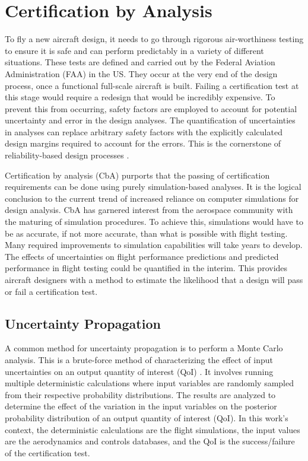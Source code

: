 \section{Certification by Analysis} \label{intro_cba}

To fly a new aircraft design, it needs to go through rigorous air-worthiness testing to ensure it is safe and can perform predictably in a variety of different situations.
These tests are defined and carried out by the Federal Aviation Administration (FAA) \cite{romanowski_flight_2018} in the US.
They occur at the very end of the design process, once a functional full-scale aircraft is built. 
Failing a certification test at this stage would require a redesign that would be incredibly expensive. 
To prevent this from occurring, safety factors are employed to account for potential uncertainty and error in the design analyses.
The quantification of uncertainties in analyses can replace arbitrary safety factors with the explicitly calculated design margins required to account for the errors.
This is the cornerstone of reliability-based design processes \cite{reliability}.

Certification by analysis (CbA) purports that the passing of certification requirements can be done using purely simulation-based analyses. 
It is the logical conclusion to the current trend of increased reliance on computer simulations for design analysis.
CbA has garnered interest from the aerospace community with the maturing of simulation procedures.
To achieve this, simulations would have to be as accurate, if not more accurate, than what is possible with flight testing.  
Many required improvements to simulation capabilities \cite{slotnick_cfd_nodate} will take years to develop.
The effects of uncertainties on flight performance predictions and predicted performance in flight testing could be quantified in the interim.
This provides aircraft designers with a method to estimate the likelihood that a design will pass or fail a certification test.

\subsection{Uncertainty Propagation}

A common method for uncertainty propagation is to perform a Monte Carlo analysis.
This is a brute-force method of characterizing the effect of input uncertainties on an output quantity of interest (QoI) \cite{janssen2013monte,thompson1992monte}.
It involves running multiple deterministic calculations where input variables are randomly sampled from their respective probability distributions.
The results are analyzed to determine the effect of the variation in the input variables on the posterior probability distribution of an output quantity of interest (QoI). 
In this work's context, the deterministic calculations are the flight simulations, the input values are the aerodynamics and controls databases, and the QoI is the success/failure of the certification test. 

